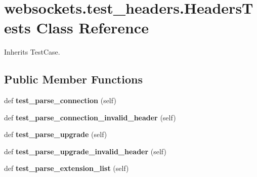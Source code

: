 \hypertarget{classwebsockets_1_1test__headers_1_1_headers_tests}{}\section{websockets.\+test\+\_\+headers.\+Headers\+Tests Class Reference}
\label{classwebsockets_1_1test__headers_1_1_headers_tests}


Inherits Test\+Case.

\subsection*{Public Member Functions}
\begin{DoxyCompactItemize}
\item 
\mbox{\label{classwebsockets_1_1test__headers_1_1_headers_tests_a30b2fe72aeba9b7322941a552a742d91}} 
def {\bfseries test\+\_\+parse\+\_\+connection} (self)
\item 
\mbox{\label{classwebsockets_1_1test__headers_1_1_headers_tests_a548be4df2ba81fbcb07aa308f78aa292}} 
def {\bfseries test\+\_\+parse\+\_\+connection\+\_\+invalid\+\_\+header} (self)
\item 
\mbox{\label{classwebsockets_1_1test__headers_1_1_headers_tests_a93fb5b4dc0b5959e7eeaa0819d487532}} 
def {\bfseries test\+\_\+parse\+\_\+upgrade} (self)
\item 
\mbox{\label{classwebsockets_1_1test__headers_1_1_headers_tests_a5c8f3c74e3aad16bdd71ba8f4bab0abc}} 
def {\bfseries test\+\_\+parse\+\_\+upgrade\+\_\+invalid\+\_\+header} (self)
\item 
\mbox{\label{classwebsockets_1_1test__headers_1_1_headers_tests_aa910eae989f00270d97b35b5795ff5a8}} 
def {\bfseries test\+\_\+parse\+\_\+extension\+\_\+list} (self)
\item 
\mbox{\label{classwebsockets_1_1test__headers_1_1_headers_tests_a40a81b35ac2a9cb80e95b103904b2c6e}} 

\end{DoxyCompactItemize}
